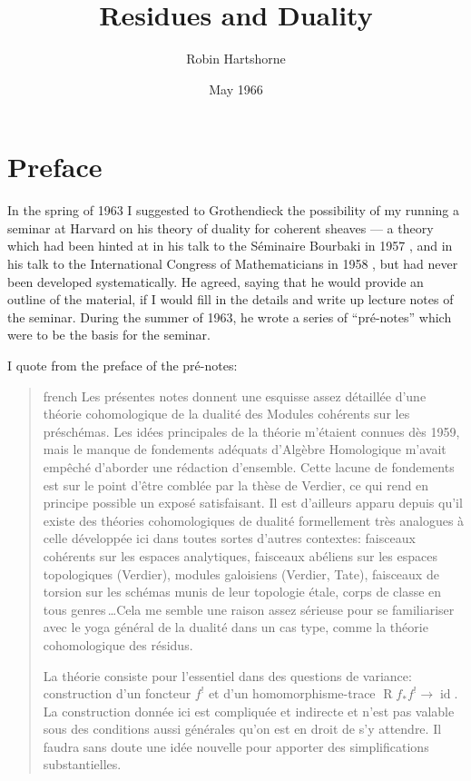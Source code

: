 \documentclass[12pt]{book}
\theoremstyle{definition}
\theoremstyle{plain}
\newcommand{\RR}{\operatorname{R}}
\begin{document}
\frontmatter
\title{Residues and Duality}
\author{Robin Hartshorne}
\date{May 1966}
\maketitle
\chapter*{Preface}

In the spring of 1963 I suggested to Grothendieck the possibility of my running a seminar at Harvard on his theory of duality for coherent sheaves --- a theory which had been hinted at in his talk to the Séminaire Bourbaki in 1957 \cite{8}, and in his talk to the International Congress of Mathematicians in 1958 \cite{9}, but had never been developed systematically. He agreed, saying that he would provide an outline of the material, if I would fill in the details and write up lecture notes of the seminar. During the summer of 1963, he wrote a series of ``pré-notes'' \cite{10} which were to be the basis for the seminar.

I quote from the preface of the pré-notes:

\begin{quote}
\begin{hyphenrules}{french}
Les présentes notes donnent une esquisse assez détaillée d'une théorie cohomologique de la dualité des Modules cohérents sur les préschémas. Les idées principales de la théorie m'étaient connues dès 1959, mais le manque de fondements adéquats d'Algèbre Homologique m'avait empêché d'aborder une rédaction d'ensemble. Cette lacune de fondements est sur le point d'être comblée par la thèse de Verdier, ce qui rend en principe possible un exposé satisfaisant. Il est d'ailleurs apparu depuis qu'il existe des théories cohomologiques de dualité formellement très analogues à celle développée ici dans toutes sortes d'autres contextes: faisceaux cohérents sur les espaces analytiques, faisceaux abéliens sur les espaces topologiques (Verdier), modules galoisiens (Verdier, Tate), faisceaux de torsion sur les schémas munis de leur topologie étale, corps de classe en tous genres\,\dots Cela me semble une raison assez sérieuse pour se familiariser avec le yoga général de la dualité dans un cas type, comme la théorie cohomologique des résidus.

La théorie consiste pour l'essentiel dans des questions de variance: construction d'un foncteur \(f^{!}\) et d'un homomorphisme-trace \(\RR f_{*}f^{!}\to\operatorname{id}\). La construction donnée ici est compliquée et indirecte et n'est pas valable sous des conditions aussi générales qu'on est en droit de s'y attendre. Il faudra sans doute une idée nouvelle pour apporter des simplifications substantielles.
\end{hyphenrules}
\end{quote}
\end{document}
